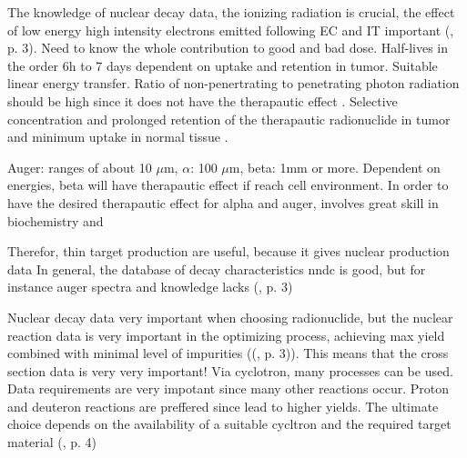 The knowledge of nuclear decay data, the ionizing radiation is crucial, the effect of low energy high intensity electrons emitted following EC and IT important (\cite{international2012iaea}, p. 3). Need to know the whole contribution to good and bad dose. Half-lives in the order 6h to 7 days dependent on uptake and retention in tumor. Suitable linear energy transfer. Ratio of non-penertrating to penetrating photon radiation should be high since it does not have the therapautic effect \cite{international2012iaea, p. 1}. Selective concentration and prolonged retention of the therapautic radionuclide in tumor and minimum uptake in normal tissue \cite{international2012iaea, p. 2}. 

Auger: ranges of about 10 $\mu$m, $\alpha$: 100 $\mu$m, beta: 1mm or more. Dependent on energies, beta will have therapautic effect if reach cell environment. In order to have the desired therapautic effect for alpha and auger, involves great skill in biochemistry and 

Therefor, thin target production are useful, because it gives nuclear production data 
In general, the database of decay characteristics nndc is good, but for instance auger spectra and knowledge lacks (\cite{international2012iaea}, p. 3)

Nuclear decay data very important when choosing radionuclide, but the nuclear reaction data is very important in the optimizing process, achieving max yield combined with minimal level of impurities ((\cite{international2012iaea}, p. 3)). This means that the cross section data is very very important! Via cyclotron, many processes can be used. Data requirements are very impotant since many other reactions occur. Proton and deuteron reactions are preffered since lead to higher yields. The ultimate choice depends on the availability of a suitable cycltron and the required target material (\cite{international2012iaea}, p. 4)





